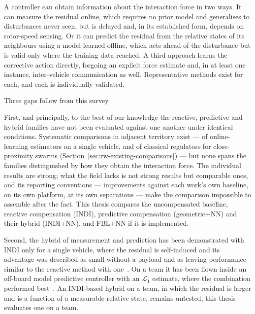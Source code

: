 A controller can obtain information about the interaction force in two ways. It can measure the
residual online, which requires no prior model and generalises to disturbances never seen, but is
delayed and, in its established form, depends on rotor-speed sensing. Or it can predict the
residual from the relative states of its neighbours using a model learned offline, which acts ahead
of the disturbance but is valid only where the training data reached. A third approach learns the
corrective action directly, forgoing an explicit force estimate and, in at least one instance,
inter-vehicle communication as well. Representative methods exist for each, and each is
individually validated.

Three gaps follow from this survey.

First, and principally, to the best of our knowledge the reactive, predictive and hybrid families
have not been evaluated against one another under identical conditions. Systematic comparisons in
adjacent territory exist --- of online-learning estimators on a single vehicle, and of classical
regulators for close-proximity swarms (Section~\ref{sec:rw-existing-comparisons}) --- but none
spans the families distinguished by how they obtain the interaction force. The individual results are strong; what the field lacks is not strong results
but comparable ones, and its reporting conventions --- improvements against each work's own
baseline, on its own platform, at its own separations --- make the comparison impossible to
assemble after the fact. This thesis compares the uncompensated baseline, reactive compensation
(INDI), predictive compensation (geometric+NN) and their hybrid (INDI+NN), and FBL+NN if it is
implemented.

Second, the hybrid of measurement and prediction has been demonstrated with INDI only for a single
vehicle, where the residual is self-induced and its advantage was described as small without a
payload and as leaving performance similar to the reactive method with
one~\cite{cobobriesewitz2026lindi}. On a team it has been flown inside an off-board model predictive
controller with an $\mathcal{L}_1$ estimate, where the combination performed
best~\cite{hsieh2025onlineadaptation}. An INDI-based hybrid on a team, in which the residual is
larger and is a function of a measurable relative state, remains untested; this thesis evaluates
one on a team.

